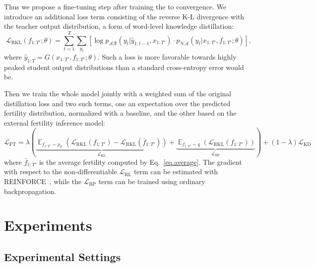 \documentclass{article} \usepackage{iclr2018_conference,times}
\begin{document}
Thus we propose a fine-tuning step after training the \model{} to convergence. We introduce an additional loss term consisting of the reverse K-L divergence with the teacher output distribution, a form of word-level knowledge distillation:
\begin{equation}
\mathcal{L}_\text{RKL}\left(f_{1:T'}; \theta \right)=  \sum_{t=1}^T\sum_{y_t}\left[\log p_{\mathcal{AR}}\left(y_t|\hat{y}_{1:t-1}, x_{1:T'}\right)\cdot p_{\mathcal{NA}}\left(y_t|x_{1:T'}, f_{1:T'}; \theta \right)\right],
\label{eq.soft-conceptual}
\end{equation}
where $\hat{y}_{1:T}=G(x_{1:T'}, f_{1:T'};\theta)$. Such a loss is more favorable towards highly peaked student output distributions than a standard cross-entropy error would be.

Then we train the whole model jointly with a weighted sum of the original distillation loss and two such terms, one an expectation over the predicted fertility distribution, normalized with a baseline, and the other based on the external fertility inference model:
\begin{equation}
\mathcal{L}_\text{FT} = \lambda \left(\underbrace{\mathop{\mathbb{E}}_{f_{1:T'} \sim p_F}\left(\mathcal{L}_\text{RKL}\left(f_{1:T'}\right) - \mathcal{L}_\text{RKL}\left(\bar{f}_{1:T'}\right)\right)}_{\mathcal{L}_\text{RL}} + \underbrace{\mathop{\mathbb{E}}_{f_{1:T'} \sim q}\left(\mathcal{L}_\text{RKL}\left(f_{1:T'}\right)\right)}_{\mathcal{L}_\text{BP}}\right) + (1 - \lambda)\mathcal{L}_\text{KD}
\end{equation}
where $\bar{f}_{1:T'}$ is the average fertility computed by Eq.~\ref{eq.average}.
The gradient with respect to the non-differentiable $\mathcal{L}_\text{RL}$ term can be estimated with REINFORCE~\citep{williams1992simple}, while the $\mathcal{L}_\text{BP}$ term can be trained using ordinary backpropagation.

\section{Experiments}
\subsection{Experimental Settings}
\vspace{-5pt}
\end{document}
